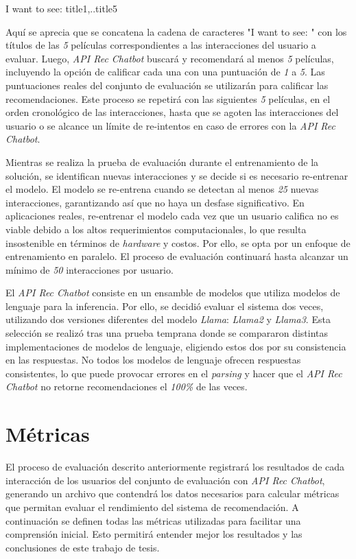 \documentclass[11pt,a4paper,twoside]{thesis}
\begin{document}
\begin{center}I want to see: title1,..title5\end{center}

Aquí se aprecia que se concatena la cadena de caracteres "I want to see: " con los títulos de las \textit{5} películas correspondientes a las interacciones del usuario a evaluar. Luego, \textit{API Rec Chatbot} buscará y recomendará al menos \textit{5} películas, incluyendo la opción de calificar cada una con una puntuación de \textit{1} a \textit{5}. Las puntuaciones reales del conjunto de evaluación se utilizarán para calificar las recomendaciones. Este proceso se repetirá con las siguientes \textit{5} películas, en el orden cronológico de las interacciones, hasta que se agoten las interacciones del usuario o se alcance un límite de re-intentos en caso de errores con la \textit{API Rec Chatbot}.

Mientras se realiza la prueba de evaluación durante el entrenamiento de la solución, se identifican nuevas interacciones y se decide si es necesario re-entrenar el modelo. El modelo se re-entrena cuando se detectan al menos \textit{25} nuevas interacciones, garantizando así que no haya un desfase significativo. En aplicaciones reales, re-entrenar el modelo cada vez que un usuario califica no es viable debido a los altos requerimientos computacionales, lo que resulta insostenible en términos de \textit{hardware} y costos. Por ello, se opta por un enfoque de entrenamiento en paralelo. El proceso de evaluación continuará hasta alcanzar un mínimo de \textit{50} interacciones por usuario.

El \textit{API Rec Chatbot} consiste en un ensamble de modelos que utiliza modelos de lenguaje para la inferencia. Por ello, se decidió evaluar el sistema dos veces, utilizando dos versiones diferentes del modelo \textit{Llama}: \textit{Llama2} y \textit{Llama3}. Esta selección se realizó tras una prueba temprana donde se compararon distintas implementaciones de modelos de lenguaje, eligiendo estos dos por su consistencia en las respuestas. No todos los modelos de lenguaje ofrecen respuestas consistentes, lo que puede provocar errores en el \textit{parsing} y hacer que el \textit{API Rec Chatbot} no retorne recomendaciones el \textit{100\%} de las veces.


\section{Métricas}

El proceso de evaluación descrito anteriormente registrará los resultados de cada interacción de los usuarios del conjunto de evaluación con  \textit{API Rec Chatbot}, generando un archivo que contendrá los datos necesarios para calcular métricas que permitan evaluar el rendimiento del sistema de recomendación. A continuación se definen todas las métricas utilizadas para facilitar una comprensión inicial. Esto permitirá entender mejor los resultados y las conclusiones de este trabajo de tesis.
\end{document}
